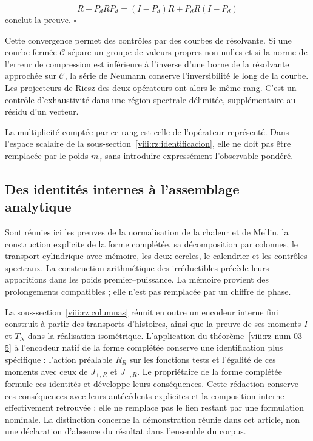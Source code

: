 \[
R-P_dRP_d=(I-P_d)R+P_dR(I-P_d)
\]
conclut la preuve. \hfill\(\square\)

Cette convergence permet des contrôles par des courbes de résolvante. Si une courbe fermée \(\mathcal C\) sépare un groupe de valeurs propres non nulles et si la norme de l’erreur de compression est inférieure à l’inverse d’une borne de la résolvante approchée sur \(\mathcal C\), la série de Neumann conserve l’inversibilité le long de la courbe. Les projecteurs de Riesz des deux opérateurs ont alors le même rang. C’est un contrôle d’exhaustivité dans une région spectrale délimitée, supplémentaire au résidu d’un vecteur.

La multiplicité comptée par ce rang est celle de l'opérateur représenté. Dans l'espace scalaire de la sous-section~\ref{viii:rz:identificacion}, elle ne doit pas être remplacée par le poids \(m_\gamma\) sans introduire expressément l'observable pondéré.

\subsection{Des identités internes à l’assemblage analytique}
\label{viii:rz:alcance}
Sont réunies ici les preuves de la normalisation de la chaleur et de Mellin, la construction explicite de la forme complétée, sa décomposition par colonnes, le transport cylindrique avec mémoire, les deux cercles, le calendrier et les contrôles spectraux. La construction arithmétique des irréductibles précède leurs apparitions dans les poids premier–puissance. La mémoire provient des prolongements compatibles ; elle n'est pas remplacée par un chiffre de phase.

La sous-section~\ref{viii:rz:columnas} réunit en outre un encodeur interne fini construit à partir des transports d’histoires, ainsi que la preuve de ses moments \(I\) et \(T_N\) dans la réalisation isométrique. L’application du théorème~\ref{viii:rz-num-03-5} à l’encodeur natif de la forme complétée conserve une identification plus spécifique : l’action préalable \(R_R\) sur les fonctions tests et l’égalité de ces moments avec ceux de \(J_{+,R}\) et \(J_{-,R}\). Le propriétaire de la forme complétée formule ces identités et développe leurs conséquences. Cette rédaction conserve ces conséquences avec leurs antécédents explicites et la composition interne effectivement retrouvée ; elle ne remplace pas le lien restant par une formulation nominale. La distinction concerne la démonstration réunie dans cet article, non une déclaration d’absence du résultat dans l’ensemble du corpus.

